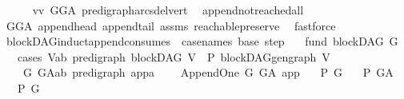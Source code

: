 \begin{isabellebody}
\ \ \ \ \isamarkupfalse%
\ vv\ GG{\isacharunderscore}{\kern0pt}A\ pre{\isacharunderscore}{\kern0pt}digraph{\isachardot}{\kern0pt}arcs{\isacharunderscore}{\kern0pt}del{\isacharunderscore}{\kern0pt}vert\ \isamarkupfalse%
\ append{\isacharunderscore}{\kern0pt}not{\isacharunderscore}{\kern0pt}reached{\isacharunderscore}{\kern0pt}all\isanewline
\ \ \ \ \isamarkupfalse%
\ GG{\isacharunderscore}{\kern0pt}A\ append{\isacharunderscore}{\kern0pt}head\ append{\isacharunderscore}{\kern0pt}tail\ assms\ reachable{}{\isacharunderscore}{\kern0pt}preserve\ \isamarkupfalse%
\ fastforce\ \isanewline
{}\isamarkupfalse%
%
\endisatagproof
{\isafoldproof}%
%
\isadelimproof
\isanewline
%
\endisadelimproof
\isanewline
\isanewline
{}\isamarkupfalse%
\ blockDAG{\isacharunderscore}{\kern0pt}induct{\isacharunderscore}{\kern0pt}append{\isacharbrackleft}{\kern0pt}consumes\ {}{\isacharcomma}{\kern0pt}\ case{\isacharunderscore}{\kern0pt}names\ base\ step{\isacharbrackright}{\kern0pt}{\isacharcolon}{\kern0pt}\isanewline
\ \ \ fund{\isacharcolon}{\kern0pt}\ {\isachardoublequoteopen}blockDAG\ G{\isachardoublequoteclose}\isanewline
\ \ \ cases{\isacharcolon}{\kern0pt}\ {\isachardoublequoteopen}{\isasymAnd}V{\isacharcolon}{\kern0pt}{\isacharcolon}{\kern0pt}{\isacharparenleft}{\kern0pt}{\isacharprime}{\kern0pt}a{\isacharcomma}{\kern0pt}{\isacharprime}{\kern0pt}b{\isacharparenright}{\kern0pt}\ pre{\isacharunderscore}{\kern0pt}digraph{\isachardot}{\kern0pt}\ blockDAG\ V\ {\isasymLongrightarrow}\ P\ {\isacharparenleft}{\kern0pt}blockDAG{\isachardot}{\kern0pt}gen{\isacharunderscore}{\kern0pt}graph\ V{\isacharparenright}{\kern0pt}{\isachardoublequoteclose}\isanewline
\ \ \ \ {\isachardoublequoteopen}{\isasymAnd}G\ G{\isacharunderscore}{\kern0pt}A{\isacharcolon}{\kern0pt}{\isacharcolon}{\kern0pt}{\isacharparenleft}{\kern0pt}{\isacharprime}{\kern0pt}a{\isacharcomma}{\kern0pt}{\isacharprime}{\kern0pt}b{\isacharparenright}{\kern0pt}\ pre{\isacharunderscore}{\kern0pt}digraph{\isachardot}{\kern0pt}\ {\isasymAnd}app{\isacharcolon}{\kern0pt}{\isacharcolon}{\kern0pt}{\isacharprime}{\kern0pt}a{\isachardot}{\kern0pt}\ \isanewline
\ \ \ Append{\isacharunderscore}{\kern0pt}One\ G\ G{\isacharunderscore}{\kern0pt}A\ app\isanewline
\ \ {\isasymLongrightarrow}\ {\isacharparenleft}{\kern0pt}P\ G{\isacharparenright}{\kern0pt}\isanewline
\ \ {\isasymLongrightarrow}\ P\ G{\isacharunderscore}{\kern0pt}A{\isachardoublequoteclose}\isanewline
\ \ \ {\isachardoublequoteopen}P\ G{\isachardoublequoteclose}\isanewline

\end{isabellebody}
